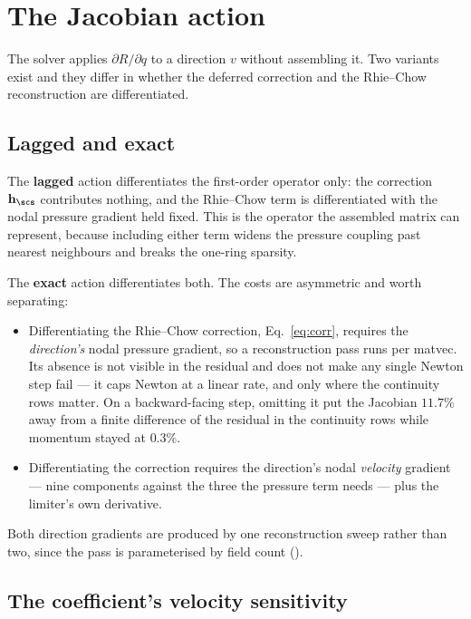 \section{The Jacobian action}
\label{sec:jac}

The solver applies $\partial R/\partial q$ to a direction $v$ without assembling it. Two variants
exist and they differ in whether the deferred correction and the Rhie--Chow reconstruction are
differentiated.

\subsection{Lagged and exact}

The \textbf{lagged} action differentiates the first-order operator only: the correction
$\mathbf{h}_\scs$ contributes nothing, and the Rhie--Chow term is differentiated with the nodal
pressure gradient held fixed. This is the operator the assembled matrix can represent, because
including either term widens the pressure coupling past nearest neighbours and breaks the
one-ring sparsity.

The \textbf{exact} action differentiates both. The costs are asymmetric and worth separating:

\begin{itemize}
\item Differentiating the Rhie--Chow correction, Eq.~\eqref{eq:corr}, requires the
      \emph{direction's} nodal pressure gradient, so a reconstruction pass runs per matvec. Its
      absence is not visible in the residual and does not make any single Newton step fail --- it
      caps Newton at a linear rate, and only where the continuity rows matter. On a
      backward-facing step, omitting it put the Jacobian $11.7\%$ away from a finite difference of
      the residual in the continuity rows while momentum stayed at $0.3\%$.
\item Differentiating the correction requires the direction's nodal \emph{velocity} gradient ---
      nine components against the three the pressure term needs --- plus the limiter's own
      derivative.
\end{itemize}

Both direction gradients are produced by one reconstruction sweep rather than two, since the pass
is parameterised by field count ().

\subsection{The coefficient's velocity sensitivity}

